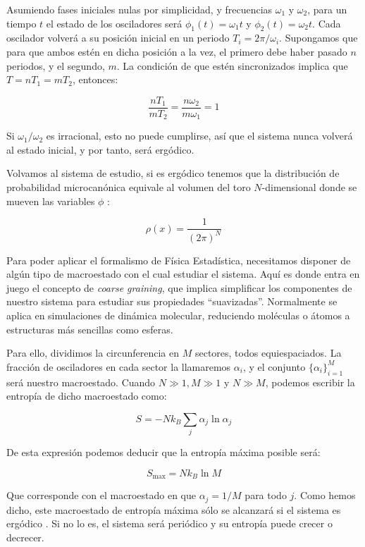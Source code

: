 \documentclass[11pt, a4paper]{article} %
\theoremstyle{named}
\begin{document}
Asumiendo fases iniciales nulas por simplicidad, y frecuencias $\omega_1$ y $\omega_2$, para un tiempo $t$ el estado de los osciladores será $\phi_1(t) =  \omega_1 t$ y $\phi_2(t) = \omega_2 t$. Cada oscilador volverá a su posición inicial en un periodo $T_i = 2\pi / \omega_i$. Supongamos que para que ambos estén en dicha posición a la vez, el primero debe haber pasado $n$ periodos, y el segundo, $m$. La condición de que estén sincronizados implica que $T = nT_1 = mT_2$, entonces:

$$
\frac{nT_1}{mT_2} = \frac{n \omega_2}{m \omega_1} = 1
$$

Si $\omega_1 / \omega_2$ es irracional, esto no puede cumplirse, así que el sistema nunca volverá al estado inicial, y por tanto, será ergódico.

Volvamos al sistema de estudio, si es ergódico tenemos que la distribución de probabilidad microcanónica equivale al volumen del toro $N$-dimensional donde se mueven las variables $\phi$ \cite{dyson}:

$$
\rho (x) = \frac{1}{(2\pi)^N}
$$

Para poder aplicar el formalismo de Física Estadística, necesitamos disponer de algún tipo de macroestado con el cual estudiar el sistema. Aquí es donde entra en juego el concepto de \textit{coarse graining}, que implica simplificar los componentes de nuestro sistema para estudiar sus propiedades ``suavizadas''. Normalmente se aplica en simulaciones de dinámica molecular, reduciendo moléculas o átomos a estructuras más sencillas como esferas.

Para ello, dividimos la circunferencia en $M$ sectores, todos equiespaciados. La fracción de osciladores en cada sector la llamaremos $\alpha_i$, y el conjunto $\{\alpha_i\}_{i=1}^M$ será nuestro macroestado.
Cuando $N \gg 1, M \gg 1$ y $N \gg M$, podemos escribir la entropía de dicho macroestado como:

\begin{equation}\label{eq:oscS}
S=-N k_{B} \sum_{j} \alpha_{j} \ln \alpha_{j}
\end{equation}

De esta expresión podemos deducir que la entropía máxima posible será:

\begin{equation}\label{eq:oscSmax}
S_{\mathrm{max}}=N k_{B} \ln M
\end{equation}

Que corresponde con el macroestado en que $\alpha_j = 1/M$ para todo $j$. Como hemos dicho, este macroestado de entropía máxima sólo se alcanzará si el sistema es ergódico \cite{groot}. Si no lo es, el sistema será periódico y su entropía puede crecer o decrecer.
\end{document}
